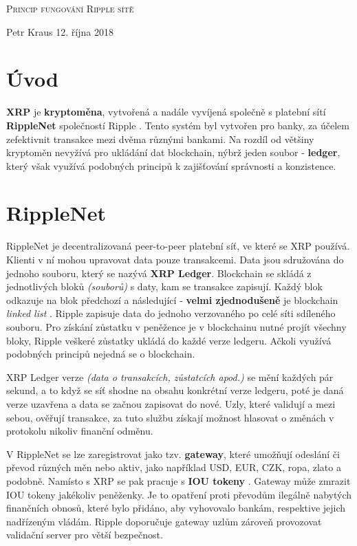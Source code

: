 \documentclass[hidelinks, titlepage]{article}
\begin{document}
\begin{titlepage}
\centering
 
\vspace{5cm}
{\scshape\LARGE Princip fungování Ripple sítě \par}
\vfill
\large Petr Kraus
\vfill
12. října 2018
\end{titlepage}

\tableofcontents
\clearpage

\section{Úvod}
\textbf{XRP} je \textbf{kryptoměna}, vytvořená a nadále vyvíjená společně s platební sítí \textbf{RippleNet} společností Ripple \cite{ripple}. Tento systém byl vytvořen pro banky, za účelem zefektivnit transakce mezi dvěma různými bankami. Na rozdíl od většiny kryptoměn nevyžívá pro ukládání dat blockchain, nýbrž jeden soubor - \textbf{ledger}, který však využívá podobných principů k zajišťování správnosti a konzistence.

\section{RippleNet} \label{sec:rippleNet}
RippleNet je decentralizovaná peer-to-peer platební síť, ve které se XRP používá. Klienti v ní mohou upravovat data pouze transakcemi. Data jsou sdružována do jednoho souboru, který se nazývá \textbf{XRP Ledger}. Blockchain se skládá z jednotlivých bloků \textit{(souborů)} s daty, kam se transakce zapisují. Každý blok odkazuje na blok předchozí a následující - \textbf{velmi zjednodušeně} je blockchain \textit{linked list} \cite{blockchain}. Ripple zapisuje data do jednoho verzovaného po celé síti sdíleného souboru. Pro získání zůstatku v peněžence je v blockchainu nutné projít všechny bloky, Ripple veškeré zůstatky ukládá do každé verze ledgeru. Ačkoli využívá podobných principů nejedná se o blockchain.

XRP Ledger verze \textit{(data o transakcích, zůstatcích apod.)} se mění každých pár sekund, a to když se síť shodne na obsahu konkrétní verze ledgeru, poté je daná verze uzavřena a data se začnou zapisovat do nové. Uzly, které validují a mezi sebou, ověřují transakce, za tuto službu získají možnost hlasovat o změnách v protokolu nikoliv finanční odměnu.

V RippleNet se lze zaregistrovat jako tzv. \textbf{gateway}, které umožňují odeslání či převod různých měn nebo aktiv, jako například USD, EUR, CZK, ropa, zlato a podobně. Namísto s XRP se pak pracuje s \textbf{IOU tokeny} \cite{IOU}. Gateway může zmrazit IOU tokeny jakékoliv peněženky. Je to opatření proti převodům ilegálně nabytých finančních obnosů, které bylo přidáno, aby vyhovovalo bankám, respektive jejich nadřízeným vládám. Ripple doporučuje gateway uzlům zároveň provozovat validační server pro větší bezpečnost.
\end{document}
